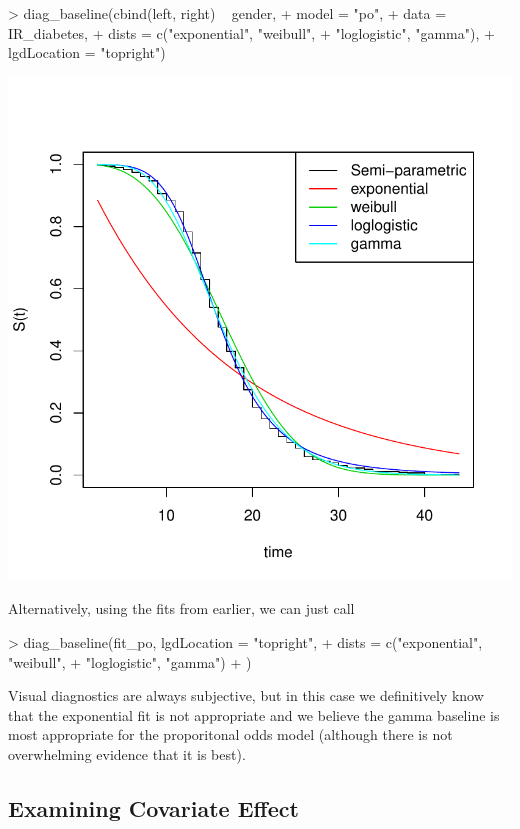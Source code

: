 \documentclass[a4paper]{article}
\begin{document}
\begin{Schunk}
\begin{Sinput}
> diag_baseline(cbind(left, right) ~ gender,
+     model = "po",
+     data = IR_diabetes,
+     dists = c("exponential", "weibull", 
+               "loglogistic", "gamma"),
+     lgdLocation = "topright")
\end{Sinput}
\end{Schunk}
\includegraphics{icenReg-013}

Alternatively, using the fits from earlier, we can just call
  
\begin{Schunk}
\begin{Sinput}
> diag_baseline(fit_po, lgdLocation = "topright",
+               dists = c("exponential", "weibull", 
+                         "loglogistic", "gamma")
+               )
\end{Sinput}
\end{Schunk}

Visual diagnostics are always subjective, but in this case we definitively know that the exponential fit is not appropriate and we believe the gamma baseline is most appropriate for the proporitonal odds model (although there is not overwhelming evidence that it is best). 
  
\subsection{Examining Covariate Effect}
  
\end{document}
